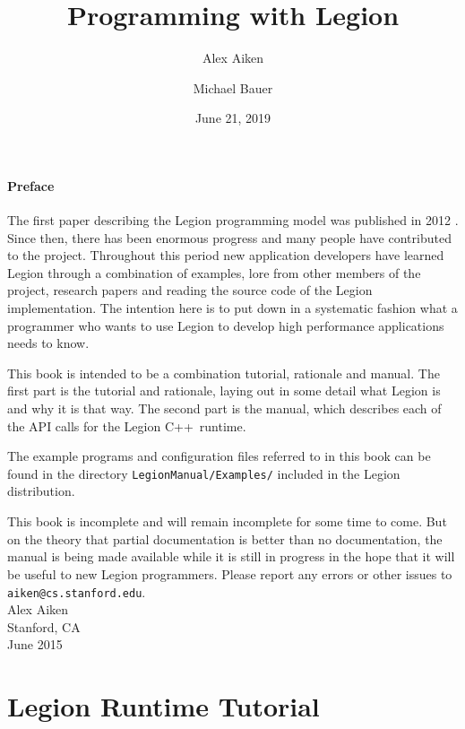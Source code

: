 \documentclass[11pt]{book}
\newcommand{\legionbook}[1]{{\tt LegionManual/Examples/#1}}
\newcommand{\Cpp}{C++}
\begin{document}
\title{Programming with Legion}
\author{Alex Aiken \and Michael Bauer}
\date{June 21, 2019}
\maketitle

\subsection*{Preface}

The first paper describing the Legion programming model
was published in 2012 \cite{Legion12}.  Since then, there has been
enormous progress and many people have contributed to
the project.  Throughout this period new application developers have
learned Legion through a combination of examples, lore from other
members of the project, research papers and reading the source code of
the Legion implementation.  The intention here is to put down in 
a systematic fashion what a programmer who wants to use
Legion to develop high performance applications needs to know.

This book is intended to be a combination tutorial, rationale and
manual.  The first part is the tutorial and rationale, laying out in some
detail what Legion is and why it is that way.  The second part is the manual, which describes
each of the API calls for the Legion \Cpp\ runtime.

The example programs and configuration files referred to in this book can be found in the directory
\legionbook{} included in the Legion distribution.

This book is incomplete and will remain incomplete for
some time to come.  But on the theory that partial documentation is better than no
documentation, the manual is being made available while it is
still in progress in the hope that it will be useful to new Legion
programmers.  Please report any errors or other issues to {\tt
  aiken@cs.stanford.edu}. \\[2in] Alex Aiken\\ Stanford, CA \\ June
2015

\tableofcontents

\part{Legion Runtime Tutorial}












\end{document}
